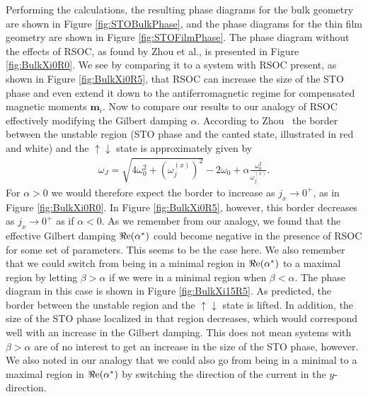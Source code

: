 Performing the calculations, the resulting phase diagrams for the bulk geometry are shown in Figure \ref{fig:STOBulkPhase}, and the phase diagrams for the thin film geometry are shown in Figure \ref{fig:STOFilmPhase}. The phase diagram without the effects of RSOC, as found by Zhou et al., is presented in Figure \ref{fig:BulkXi0R0}. We see by comparing it to a system with RSOC present, as shown in Figure \ref{fig:BulkXi0R5}, that RSOC can increase the size of the STO phase and even extend it down to the antiferromagnetic regime for compensated magnetic moments $\mathbold{m}_i$. Now to compare our results to our analogy of RSOC effectively modifying the Gilbert damping $\alpha$. According to Zhou \etal~the border between the unstable region (STO phase and the canted state, illustrated in red and white) and the $\uparrow\downarrow$ state is approximately given by
\begin{align}
    \omega_J = \sqrt{4\omega_0^2+\left(\omega_j^{(x)}\right)^2}-2\omega_0+\alpha\frac{\omega_0^2}{\omega_j^{(x)}}.
\end{align}
For $\alpha>0$ we would therefore expect the border to increase as $j_x\rightarrow 0^+$, as in Figure \ref{fig:BulkXi0R0}. In Figure \ref{fig:BulkXi0R5}, however, this border decreases as $j_x\rightarrow 0^+$ as if $\alpha<0$. As we remember from our analogy, we found that the effective Gilbert damping ${\Re\mathrm{e}} (\alpha^*)$ could become negative in the presence of RSOC for some set of parameters. This seems to be the case here. We also remember that we could switch from being in a minimal region in ${\Re\mathrm{e}} (\alpha^*)$ to a maximal region by letting $\beta>\alpha$ if we were in a minimal region when $\beta<\alpha$. The phase diagram in this case is shown in Figure \ref{fig:BulkXi15R5}. As predicted, the border between the unstable region and the $\uparrow\downarrow$ state is lifted. In addition, the size of the STO phase localized in that region decreases, which would correspond well with an increase in the Gilbert damping. This does not mean systems with $\beta>\alpha$ are of no interest to get an increase in the size of the STO phase, however. We also noted in our analogy that we could also go from being in a minimal to a maximal region in ${\Re\mathrm{e}} (\alpha^*)$ by switching the direction of the current in the $y$-direction.
